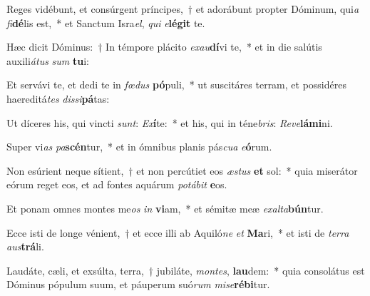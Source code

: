 \item Reges vidébunt, et consúrgent príncipes,~† et adorábunt propter Dóminum, qui\textit{a} \textit{fi}\textbf{dé}lis est,~* et Sanctum Isra\textit{el}, \textit{qui} \textit{e}\textbf{lé}\textbf{git} te.
\item Hæc dicit Dóminus:~† In témpore plácito \textit{ex}\textit{au}\textbf{dí}vi te,~* et in die salútis auxili\textit{á}\textit{tus} \textit{sum} \textbf{tu}i:
\item Et servávi te, et dedi te in \textit{fœ}\textit{dus} \textbf{pó}puli,~* ut suscitáres terram, et possidéres haereditá\textit{tes} \textit{dis}\textit{si}\textbf{pá}tas:
\item Ut díceres his, qui vincti \textit{sunt}: \textit{Ex}\textbf{í}te:~* et his, qui in téne\textit{bris}: \textit{Re}\textit{ve}\textbf{lá}\textbf{mi}ni.
\item Super vi\textit{as} \textit{pa}\textbf{scén}tur,~* et in ómnibus planis pás\textit{cu}\textit{a} \textit{e}\textbf{ó}rum.
\item Non esúrient neque sítient,~† et non percútiet eos \textit{æs}\textit{tus} \textbf{et} sol:~* quia miserátor eórum reget eos, et ad fontes aquárum \textit{po}\textit{tá}\textit{bit} \textbf{e}os.
\item Et ponam omnes montes me\textit{os} \textit{in} \textbf{vi}am,~* et sémitæ meæ \textit{ex}\textit{al}\textit{ta}\textbf{bún}tur.
\item Ecce isti de longe vénient,~† et ecce illi ab Aquiló\textit{ne} \textit{et} \textbf{Ma}ri,~* et isti de \textit{ter}\textit{ra} \textit{aus}\textbf{trá}li.
\item Laudáte, cæli, et exsúlta, terra,~† jubiláte, \textit{mon}\textit{tes}, \textbf{lau}dem:~* quia consolátus est Dóminus pópulum suum, et páuperum suó\textit{rum} \textit{mi}\textit{se}\textbf{ré}\textbf{bi}tur.

